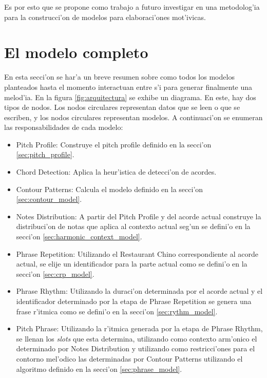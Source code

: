 Es por esto que se propone como trabajo a futuro investigar en una metodolog'ia para la construcci'on de modelos para elaboraci'ones mot'ivicas.

\begin{imagen}
    \width{5cm}
\end{imagen}

\section{El modelo completo}
En esta secci'on se har'a un breve resumen sobre como todos los modelos planteados hasta el momento interactuan entre s'i para generar finalmente una melod'ia.
En la figura \ref{fig:arquitectura} se exhibe un diagrama. En este, hay dos tipos de nodos. Los nodos circulares representan datos que se leen o que se escriben, y los nodos
circulares representan modelos. A continuaci'on se enumeran las responsabilidades de cada modelo:


\begin{imagen}
    \width{9cm}
\end{imagen}

\begin{itemize}
 \item Pitch Profile: Construye el pitch profile definido en la secci'on \ref{sec:pitch_profile}.
 \item Chord Detection: Aplica la heur'istica de detecci'on de acordes.
 \item Contour Patterns: Calcula el modelo definido en la secci'on \ref{sec:contour_model}.
 \item Notes Distribution: A partir del Pitch Profile y del acorde actual construye la distribuci'on de notas que aplica al contexto actual seg'un se defini'o en la secci'on \ref{sec:harmonic_context_model}.
 \item Phrase Repetition: Utilizando el Restaurant Chino correspondiente al acorde actual, se elije un identificador para la parte actual como 
 se defini'o en la secci'on \ref{sec:crp_model}.
 \item Phrase Rhythm: Utilizando la duraci'on determinada por el acorde actual y el identificador determinado por la etapa de Phrase Repetition se 
 genera una frase r'itmica como se defini'o en la secci'on \ref{sec:rythm_model}.
 \item Pitch Phrase: Utilizando la r'itmica generada por la etapa de Phrase Rhythm, se llenan los \emph{slots} que esta determina, utilizando
 como contexto arm'onico el determinado por Notes Distribution y utilizando como restricci'ones para el contorno mel'odico las determinadas por
 Contour Patterns utilizando el algoritmo definido en la secci'on \ref{sec:phrase_model}.
\end{itemize}

